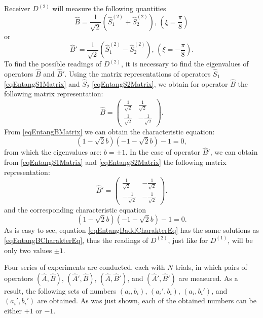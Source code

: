 Receiver $D^{(2)}$ will measure the following quantities 
\[
\hat{B} = \frac{1}{\sqrt{2}}\left(\hat{S}_1^{(2)} + \hat{S}_2^{(2)}\right),\,(\xi =
\frac{\pi}{8}) 
\]
or 
\[
\hat{B}' = \frac{1}{\sqrt{2}}\left(\hat{S}_1^{(2)} - \hat{S}_2^{(2)}\right),\,(\xi =
- \frac{\pi}{8}).
\]
To find the possible readings of $D^{(2)}$, it is necessary to find
the eigenvalues of operators $\hat{B}$ and $\hat{B}'$. Using
the matrix representations of operators $\hat{S}_1$
\eqref{eqEntangS1Matrix} and $\hat{S}_2$ \eqref{eqEntangS2Matrix},
we obtain for operator $\hat{B}$ the following matrix representation:
\begin{equation}
\hat{B} = 
\left(
\begin{array}{cc}
\frac{1}{\sqrt{2}} & \frac{1}{\sqrt{2}} \\
\frac{1}{\sqrt{2}} & -\frac{1}{\sqrt{2}} 
\end{array}
\right).
\label{eqEntangBMatrix}
\end{equation}
From \eqref{eqEntangBMatrix} we can obtain the characteristic
equation:
\begin{equation}
\left(1 -\sqrt{2} b\right)\left(- 1 -\sqrt{2} b\right) -1 = 0,
\label{eqEntangBCharakterEq}
\end{equation}
from which the eigenvalues are: $b = \pm 1$. In the case of operator
$\hat{B}'$, we can obtain from \eqref{eqEntangS1Matrix} and
\eqref{eqEntangS2Matrix} the following matrix representation:
\begin{equation}
\hat{B}' = 
\left(
\begin{array}{cc}
\frac{1}{\sqrt{2}} & -\frac{1}{\sqrt{2}} \\
-\frac{1}{\sqrt{2}} & -\frac{1}{\sqrt{2}} 
\end{array}
\right).
\label{eqEntangBaddMatrix}
\end{equation}
and the corresponding characteristic equation
\begin{equation}
\left(1 -\sqrt{2} b\right)\left(- 1 -\sqrt{2} b\right) -1 = 0.
\label{eqEntangBaddCharakterEq}
\end{equation}
As is easy to see, equation \eqref{eqEntangBaddCharakterEq} has
the same solutions as \eqref{eqEntangBCharakterEq}, thus
the readings of $D^{(2)}$, just like for $D^{(1)}$, will be only two
values $\pm 1$.

Four series of experiments are conducted, each with $N$ trials, in which
pairs of operators $\left(\hat{A},\hat{B}\right)$,
$\left(\hat{A}',\hat{B}\right)$, $\left(\hat{A},\hat{B}'\right)$, and
$\left(\hat{A}',\hat{B}'\right)$ are measured. As a result, the following
sets of numbers $\left(a_i, b_i\right)$, $\left(a_i', b_i\right)$, $\left(a_i, b_i'\right)$, and
$\left(a_i', b_i'\right)$ are obtained.
As was just shown, each
of the obtained numbers can be either $+1$ or $-1$.

